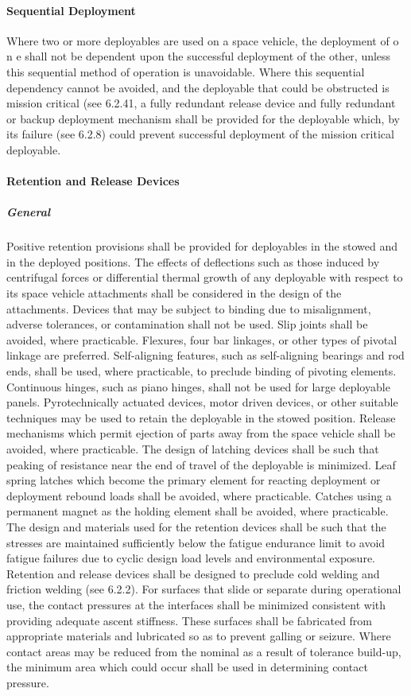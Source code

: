 \documentclass[12pt]{article}
\begin{document}
\paragraph{Sequential Deployment} %
Where two or more deployables are used on a space vehicle, the deployment of o n e shall not be dependent upon the successful deployment of the other, unless this sequential method of operation is unavoidable. 
Where this sequential dependency cannot be avoided, and the deployable that could be obstructed is mission critical (see 6.2.41, a fully redundant release device and fully redundant or backup deployment mechanism shall be provided for the deployable which, by its failure (see 6.2.8) could prevent successful deployment of the mission critical deployable.

\paragraph{Retention and Release Devices} %
\subparagraph{General} %
Positive retention provisions shall be provided for deployables in the stowed and in the deployed positions. 
The effects of deflections such as those induced by centrifugal forces or differential thermal growth of any deployable with respect to its space vehicle attachments shall be considered in the design of the attachments. 
Devices that may be subject to binding due to misalignment, adverse tolerances, or contamination shall not be used. 
Slip joints shall be avoided, where practicable. 
Flexures, four bar linkages, or other types of pivotal linkage are preferred.
Self-aligning features, such as self-aligning bearings and rod ends, shall be used, where practicable, to preclude binding of pivoting elements. 
Continuous hinges, such as piano hinges, shall not be used for large deployable panels. 
Pyrotechnically actuated devices, motor driven devices, or other suitable techniques may be used to retain the deployable in the stowed position. 
Release mechanisms which permit ejection of parts away from the space vehicle shall be avoided, where practicable. 
The design of latching devices shall be such that peaking of resistance near the end of travel of the deployable is minimized. 
Leaf spring latches which become the primary element for reacting deployment or deployment rebound loads shall be avoided, where practicable. 
Catches using a permanent magnet as the holding element shall be avoided, where practicable. 
The design and materials used for the retention devices shall be such that the stresses are maintained sufficiently below the fatigue endurance limit to avoid fatigue failures due to cyclic design load levels and environmental exposure. 
Retention and release devices shall be designed to preclude cold welding and friction welding (see 6.2.2). 
For surfaces that slide or separate during operational use, the contact pressures at the interfaces shall be minimized consistent with providing adequate ascent stiffness. 
These surfaces shall be fabricated from appropriate materials and lubricated so as to prevent galling or seizure. 
Where contact areas may be reduced from the nominal as a result of tolerance build-up, the minimum area which could occur shall be used in determining contact pressure.
\end{document}

